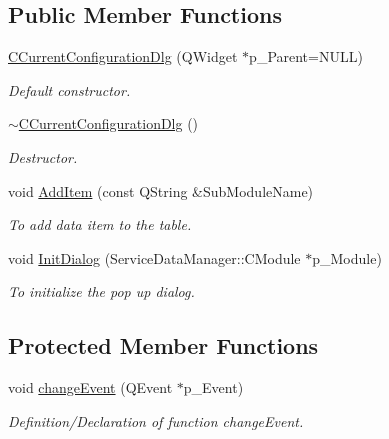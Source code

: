 \subsection*{\-Public \-Member \-Functions}
\begin{DoxyCompactItemize}
\item 
\hyperlink{classSystemTracking_1_1CCurrentConfigurationDlg_acffffa17cb0e3f30d8498d2217046e42}{\-C\-Current\-Configuration\-Dlg} (\-Q\-Widget $\ast$p\-\_\-\-Parent=\-N\-U\-L\-L)
\begin{DoxyCompactList}\small\item\em \-Default constructor. \end{DoxyCompactList}\item 
\hyperlink{classSystemTracking_1_1CCurrentConfigurationDlg_a5380d42f8ccbebd442b333e4ff3a9893}{$\sim$\-C\-Current\-Configuration\-Dlg} ()
\begin{DoxyCompactList}\small\item\em \-Destructor. \end{DoxyCompactList}\item 
void \hyperlink{classSystemTracking_1_1CCurrentConfigurationDlg_abcb4a184919a1cbdc9555dc06deac09b}{\-Add\-Item} (const \-Q\-String \&\-Sub\-Module\-Name)
\begin{DoxyCompactList}\small\item\em \-To add data item to the table. \end{DoxyCompactList}\item 
void \hyperlink{classSystemTracking_1_1CCurrentConfigurationDlg_ac215e64aeee7de43c2f44eac8f696f35}{\-Init\-Dialog} (\-Service\-Data\-Manager\-::\-C\-Module $\ast$p\-\_\-\-Module)
\begin{DoxyCompactList}\small\item\em \-To initialize the pop up dialog. \end{DoxyCompactList}\end{DoxyCompactItemize}
\subsection*{\-Protected \-Member \-Functions}
\begin{DoxyCompactItemize}
\item 
void \hyperlink{classSystemTracking_1_1CCurrentConfigurationDlg_a023ed0955dbe7607cb07c8f2f9ce7461}{change\-Event} (\-Q\-Event $\ast$p\-\_\-\-Event)
\begin{DoxyCompactList}\small\item\em \-Definition/\-Declaration of function change\-Event. \end{DoxyCompactList}\end{DoxyCompactItemize}



